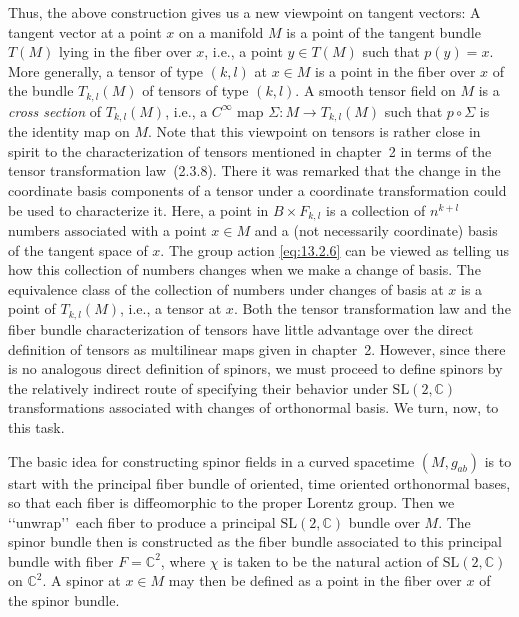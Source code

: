 Thus, the above construction gives us a new viewpoint on tangent vectors: A tangent
vector at a point \(x\) on a manifold \(M\) is a point of the tangent bundle
\(T(M)\) lying in the fiber over \(x\), i.e., a point \(y\in T(M)\) such that
\(p(y)=x\). More generally, a tensor of type \((k,l)\) at \(x\in M\) is a point in
the fiber over \(x\) of the bundle \(T_{k,l}(M)\) of tensors of type \((k,l)\). A
smooth tensor field on \(M\) is a \emph{cross section} of \(T_{k,l}(M)\), i.e., a
\(C^\infty\) map \(\Sigma:M\longrightarrow T_{k,l}(M)\) such that
\(p\circ\Sigma\) is the identity map on \(M\). Note that this viewpoint on tensors
is rather close in spirit to the characterization of tensors mentioned in chapter~2
in terms of the tensor transformation law~(2.3.8). There it was remarked that the
change in the coordinate basis components of a tensor under a coordinate
transformation could be used to characterize it. Here, a point in \(B\times F_{k,l}\)
is a collection of \(n^{k+l}\) numbers associated with a point \(x\in M\) and a (not
necessarily coordinate) basis of the tangent space of \(x\). The group action
\eqref{eq:13.2.6} can be viewed as telling us how this collection of numbers changes
when we make a change of basis. The equivalence class of the collection of numbers
under changes of basis at \(x\) is a point of \(T_{k,l}(M)\), i.e., a tensor at \(x\).
Both the tensor transformation law and the fiber bundle characterization of tensors
have little advantage over the direct definition of tensors as multilinear maps given
in chapter~2. However, since there is no analogous direct definition of spinors, we
must proceed to define spinors by the relatively indirect route of specifying their
behavior under \(\mathrm{SL}(2,\mathbb C)\) transformations associated with changes
of orthonormal basis. We turn, now, to this task.

The basic idea for constructing spinor fields in a curved spacetime \((M,g_{ab})\)
is to start with the principal fiber bundle of oriented, time oriented orthonormal
bases, so that each fiber is diffeomorphic to the proper Lorentz group. Then we
\lq\lq unwrap\rq\rq\ each fiber to produce a principal
\(\mathrm{SL}(2,\mathbb C)\) bundle over \(M\). The spinor bundle then is
constructed as the fiber bundle associated to this principal bundle with fiber
\(F=\mathbb C^2\), where \(\chi\) is taken to be the natural action of
\(\mathrm{SL}(2,\mathbb C)\) on \(\mathbb C^2\). A spinor at \(x\in M\) may then be
defined as a point in the fiber over \(x\) of the spinor bundle.


